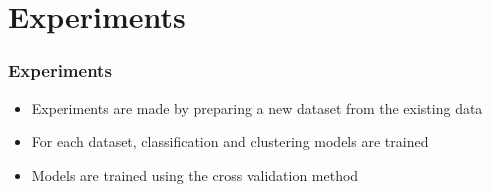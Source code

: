 \section{Experiments}

\begin{frame}
\frametitle{Experiments}

\begin{itemize}
    \item Experiments are made by preparing a new dataset from the existing data
    \item For each dataset, classification and clustering models are trained
    \item Models are trained using the cross validation method
\end{itemize}

\end{frame}

